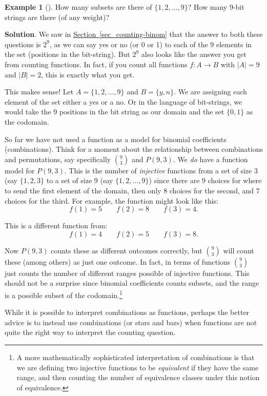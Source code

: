 \documentclass[10pt,]{book}
\theoremstyle{plain}
\theoremstyle{definition}
\theoremstyle{definition}
\newtheorem{example}[theorem]{Example}
\theoremstyle{definition}
\theoremstyle{definition}
\numberwithin{equation}{chapter}
\begin{document}
\begin{example}[]\label{example-21}
\hypertarget{p-911}{}%
How many subsets are there of \(\{1,2,\ldots, 9\}\)? How many 9-bit strings are there (of any weight)?%
\par\smallskip%
\noindent\textbf{Solution}.\hypertarget{solution-86}{}\quad%
\hypertarget{p-912}{}%
We saw in \hyperref[sec_counting-binom]{Section~\ref{sec_counting-binom}} that the answer to both these questions is \(2^9\), as we can say yes or no (or 0 or 1) to each of the 9 elements in the set (positions in the bit-string). But \(2^9\) also looks like the answer you get from counting functions. In fact, if you count all functions \(f: A \to B\) with \(|A| = 9\) and \(|B| = 2\), this is exactly what you get.%
\par
\hypertarget{p-913}{}%
This makes sense! Let \(A = \{1,2,\ldots, 9\}\) and \(B = \{y, n\}\). We are assigning each element of the set either a yes or a no. Or in the language of bit-strings, we would take the 9 positions in the bit string as our domain and the set \(\{0,1\}\) as the codomain.%
\end{example}
\hypertarget{p-914}{}%
So far we have not used a function as a model for binomial coefficients (combinations). Think for a moment about the relationship between combinations and permutations, say specifically \({9 \choose 3}\) and \(P(9,3)\). We \emph{do} have a function model for \(P(9,3)\). This is the number of \emph{injective} functions from a set of size 3 (say \(\{1,2,3\}\) to a set of size 9 (say \(\{1,2,\ldots, 9\}\)) since there are 9 choices for where to send the first element of the domain, then only 8 choices for the second, and 7 choices for the third. For example, the function might look like this:%
\begin{equation*}
f(1) = 5 \qquad f(2) = 8 \qquad f(3) = 4.
\end{equation*}
%
\par
\hypertarget{p-915}{}%
This is a different function from:%
\begin{equation*}
f(1) = 4 \qquad f(2) = 5 \qquad f(3) = 8.
\end{equation*}
%
\par
\hypertarget{p-916}{}%
Now \(P(9,3)\) counts these as different outcomes correctly, but \({9\choose 3}\) will count these (among others) as just one outcome. In fact, in terms of functions \({9 \choose 3}\) just counts the number of different ranges possible of injective functions. This should not be a surprise since binomial coefficients counts subsets, and the range is a possible subset of the codomain.\footnote{A more mathematically sophisticated interpretation of combinations is that we are defining two injective functions to be \emph{equivalent} if they have the same range, and then counting the number of equivalence classes under this notion of equivalence.\label{fn-8}}%
\par
\hypertarget{p-917}{}%
While it is possible to interpret combinations as functions, perhaps the better advice is to instead use combinations (or stars and bars) when functions are not quite the right way to interpret the counting question.%
\typeout{************************************************}
\typeout{************************************************}
\end{document}
